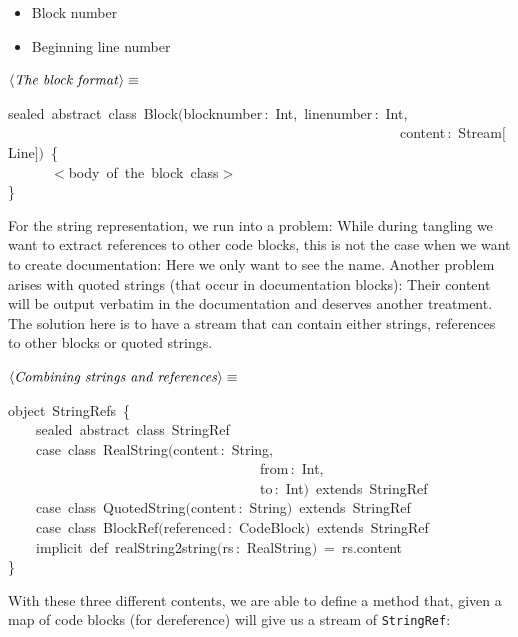 \documentclass[a4paper,12pt]{article}
\begin{document}
\begin{itemize}
\item Block number
\item Beginning line number
\end{itemize}

$\left<\mbox{\emph{The block format}}\right>\equiv$
\begin{program}{\vem sealed}~{\vem abstract}~{\vem class}~Block$($blocknumber\,{\rm :}~Int,~linenumber\,{\rm :}~Int,
\\~~~~~~~~~~~~~~~~~~~~~~~~~~~~~~~~~~~~~~~~~~~~~~~~~~~~~~~~content\,{\rm :}~Stream$[$Line$]$$)$~{\small\{}
\\~~~~~~$<$body~of~the~block~{\vem class}$>$
\\{\small\}}
\\[0.5em]\end{program}
For the string representation, we run into a problem: While during tangling
we want to extract references to other code blocks, this is not the case
when we want to create documentation: Here we only want to see the name.
Another problem arises with quoted strings (that occur in documentation blocks):
Their content will be output verbatim in the documentation and deserves another
treatment. The solution here is to have a stream that can contain either
strings, references to other blocks or quoted strings.

$\left<\mbox{\emph{Combining strings and references}}\right>\equiv$
\begin{program}{\vem object}~StringRefs~{\small\{}
\\~~~~{\vem sealed}~{\vem abstract}~{\vem class}~StringRef
\\~~~~{\vem case}~{\vem class}~RealString$($content\,{\rm :}~String,
\\~~~~~~~~~~~~~~~~~~~~~~~~~~~~~~~~~~~~from\,{\rm :}~Int,
\\~~~~~~~~~~~~~~~~~~~~~~~~~~~~~~~~~~~~to\,{\rm :}~Int$)$~{\vem extends}~StringRef
\\~~~~{\vem case}~{\vem class}~QuotedString$($content\,{\rm :}~String$)$~{\vem extends}~StringRef
\\~~~~{\vem case}~{\vem class}~BlockRef$($referenced\,{\rm :}~CodeBlock$)$~{\vem extends}~StringRef
\\[0.5em]~~~~{\vem implicit}~{\vem def}~realString2string$($rs\,{\rm :}~RealString$)$~=~rs.content
\\{\small\}}
\\[0.5em]\end{program}
With these three different contents, we are able to define a method
that, given a map of code blocks (for dereference) will give us a
stream of \texttt{StringRef}:
\end{document}
